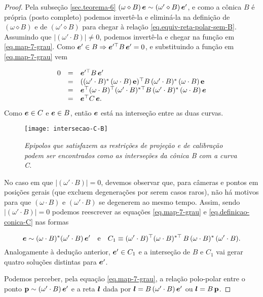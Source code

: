 \begin{proof}
Pela subseção \ref{sec.teorema-6} $(\omega\diamond B)\,\boldsymbol{e}\sim(\omega'\diamond B)\,\boldsymbol{e}'$, e como a cônica $B$ é própria (posto completo) podemos invertê-la e eliminá-la na definição de $(\omega\diamond B)$ e de $(\omega'\diamond B)$ para chegar à relação \ref{eq.equiv-reta-polar-sem-B}. Assumindo que $|(\omega'\cdot B)|\neq0$, podemos invertê-la e chegar na função em \ref{eq.map-7-grau}. Como $\boldsymbol{e}'\in B\Rightarrow \boldsymbol{e}'^\top B\,\boldsymbol{e}'=0$, e substituindo a função em \ref{eq.map-7-grau} vem

\begin{equation*}
\begin{array}{rcl}
0&=&\boldsymbol{e}'^\top B\,\boldsymbol{e}'\\
&=&((\omega' \cdot B)^*\,(\omega \cdot B)\,{\bf e})^\top B\,(\omega' \cdot B)^*\,(\omega \cdot B)\,{\bf e}\\
&=&\boldsymbol{e}^\top (\omega \cdot B)^\top (\omega' \cdot B)^{*\top}B\,(\omega' \cdot B)^*\,(\omega \cdot B)\,\boldsymbol{e}\\
&=&\boldsymbol{e}^\top C\,\boldsymbol{e}.
\end{array}
\end{equation*}  
Como $\boldsymbol{e} \in C$ e $\boldsymbol{e}\in B$, então $\boldsymbol{e}$ está na interseção entre as duas curvas.


\begin{figure}[!htb]
\centering
\texttt{[image: intersecao-C-B]}
\caption{\textit{Epipolos que satisfazem as restrições de projeção e de calibração podem ser encontrados como as interseções da cônica B com a curva C.}}
\label{inter-B-C}
\end{figure}

No caso em que $|(\omega'\cdot B)|=0$, devemos observar que, para câmeras e pontos em posições gerais (que excluem degenerações por serem casos raros), não há motivos para que $(\omega\cdot B)$ e $(\omega'\cdot B)$ se degenerem ao mesmo tempo. Assim, sendo $|(\omega'\cdot B)|=0$ podemos reescrever as equações \ref{eq.map-7-grau} e \ref{eq.definicao-conica-C} nas formas

\begin{equation*}
\boldsymbol{e}\sim (\omega\cdot B)^*(\omega'\cdot B)\,\boldsymbol{e}'\quad\text{e}\quad C_1 \equiv (\omega' \cdot B)^\top (\omega \cdot B)^{*\top}\,B\,(\omega \cdot B)^*\,(\omega' \cdot B).
\end{equation*}     
Analogamente à dedução anterior, $\boldsymbol{e}'\in C_1$ e a interseção de $B$ e $C_1$ vai gerar quatro soluções distintas para $\boldsymbol{e}'$.
 
 Podemos perceber, pela equação \ref{eq.map-7-grau}, a relação polo-polar entre o ponto ${\bf p}\sim (\omega'\cdot B)\,\boldsymbol{e}'$ e a reta $\boldsymbol{l}$ dada por $\boldsymbol{l}=B\,(\omega'\cdot B)\,\boldsymbol{e}'$ ou $\boldsymbol{l}=B\,{\bf p}$.
 

\end{proof}
